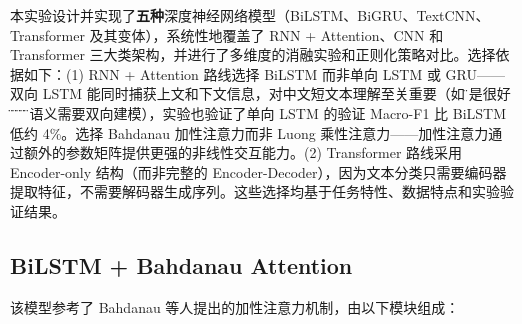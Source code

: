 本实验设计并实现了\textbf{五种}深度神经网络模型（BiLSTM、BiGRU、TextCNN、Transformer 及其变体），系统性地覆盖了 RNN + Attention、CNN 和 Transformer 三大类架构，并进行了多维度的消融实验和正则化策略对比。选择依据如下：(1) RNN + Attention 路线选择 BiLSTM 而非单向 LSTM 或 GRU——双向 LSTM 能同时捕获上文和下文信息，对中文短文本理解至关重要（如\"不是很好\"中\"不\"和\"好\"的语义需要双向建模），实验也验证了单向 LSTM 的验证 Macro-F1 比 BiLSTM 低约 4\%。选择 Bahdanau 加性注意力而非 Luong 乘性注意力——加性注意力通过额外的参数矩阵提供更强的非线性交互能力。(2) Transformer 路线采用 Encoder-only 结构（而非完整的 Encoder-Decoder），因为文本分类只需要编码器提取特征，不需要解码器生成序列。这些选择均基于任务特性、数据特点和实验验证结果。

\subsection{BiLSTM + Bahdanau Attention}

该模型参考了 Bahdanau 等人提出的加性注意力机制\cite{bahdanau2014}，由以下模块组成：

